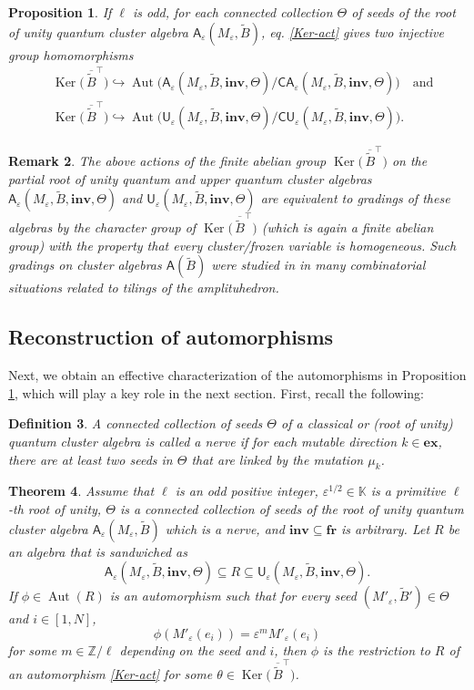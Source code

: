 \documentclass[11pt]{amsart}
\theoremstyle{plain}
\newtheorem{theorem}{Theorem}[section]
\newtheorem{proposition}[theorem]{Proposition}
\newtheorem{definition}[theorem]{Definition}
\newtheorem{remark}[theorem]{Remark}
\newcommand \bth[1] { \begin{theorem}\label{t#1} }
\newcommand \bpr[1] { \begin{proposition}\label{p#1} }
\newcommand \bde[1] { \begin{definition}\label{d#1}\rm }
\newcommand \bre[1] { \begin{remark}\label{r#1}\rm }
\renewcommand {\eth} { \end{theorem} }
\newcommand {\epr} { \end{proposition} }
\newcommand {\ede} { \end{definition} }
\newcommand {\ere} { \end{remark} }
\newcommand \prref[1]{Proposition \ref{p#1}}
\def \KK {{\mathbb C}}
\def \KK {{\mathbb K}}
\def \Zset {{\mathbb Z}}
\def \A {{\boldsymbol{\mathsf A}}}
\def \C {{\boldsymbol{\mathsf C}}}
\def \U {{\boldsymbol{\mathsf U}}}
\def \B  {{\widetilde{B}}}
\newcommand \ex {{\mathbf{ex}}}
\newcommand \fr {{\mathbf{fr}}}
\newcommand \inv {{\mathbf{inv}}}
\def \ep {\varepsilon}
\def \hra {\hookrightarrow}
\def \ol {\overline}
\DeclareMathOperator \Aut { {\mathrm{Aut}} }
\DeclareMathOperator \Ker { {\mathrm{Ker}} }
\begin{document}
\bpr{ep-act} If $\ell$ is odd, 
for each connected collection $\Theta$ of seeds of the root of unity quantum cluster algebra $\A_\ep(M_\ep, \B)$, eq. \eqref{Ker-act} gives two injective group homomorphisms
\begin{align*}
&\Ker \big( \, \ol{\B}^\top \big) \hra \Aut \big(\A_\ep(M_\ep, \B, \inv, \Theta)/ \C\A_\ep(M_\ep, \B, \inv, \Theta) \big) \quad \mbox{and} \\
&\Ker \big( \, \ol{\B}^\top \big) \hra \Aut \big(\U_\ep(M_\ep, \B, \inv, \Theta)/ \C\U_\ep(M_\ep, \B, \inv, \Theta) \big).
\end{align*}
\epr
\bre{grad}
The above actions of the finite abelian group $\Ker \big( \, \ol{\B}^\top \big)$ on the partial root of unity quantum and upper quantum cluster algebras $\A_\ep(M_\ep, \B, \inv, \Theta)$ and $\U_\ep(M_\ep, \B, \inv, \Theta)$ are equivalent to gradings of these algebras by the character group of $\Ker \big( \, \ol{\B}^\top \big)$ (which is again a finite abelian group) with the property that every cluster/frozen variable is homogeneous. Such gradings on cluster algebras $\A(\B)$ were studied in \cite{WY} 
in many combinatorial situations related to tilings of the amplituhedron. 
\ere
\subsection{Reconstruction of automorphisms} 
Next, we obtain an effective characterization of the automorphisms in \prref{ep-act}, which will play a key role in the next section. First, recall the following:

\bde{nerve} \cite{F} A connected collection of seeds $\Theta$ of a classical or (root of unity) quantum cluster algebra is called a {\em{nerve}} if for each mutable direction $k \in \ex$, 
there are at least two seeds in $\Theta$ that are linked by the mutation $\mu_k$.
\ede

\bth{nerve} Assume that $\ell$ is an odd positive integer, $\ep^{1/2} \in \KK$ is a primitive $\ell$-th root of unity, $\Theta$ is a connected collection of seeds of the root of unity quantum cluster algebra $\A_\ep(M_\ep, \B)$ which is a nerve, and $\inv \subseteq \fr$ is arbitrary.  Let $R$ be an algebra that is sandwiched as 
\[
\A_\ep(M_\ep, \B, \inv, \Theta) \subseteq R \subseteq \U_\ep(M_\ep, \B, \inv, \Theta).
\]
If $\phi \in \Aut(R)$ is an automorphism such that for every seed $(M'_\ep, \B') \in \Theta$ and $i \in [1,N]$, 
\begin{equation}
\label{condII}
\phi( M'_\ep(e_i)) = \ep^m M'_\ep(e_i)
\end{equation}
for some $m \in \Zset / \ell$ depending on the seed and $i$, then $\phi$ is the restriction to $R$ of an automorphism \eqref{Ker-act} for some $\theta \in \Ker \big( \, \ol{\B}^\top \big)$.
\eth
\end{document}
